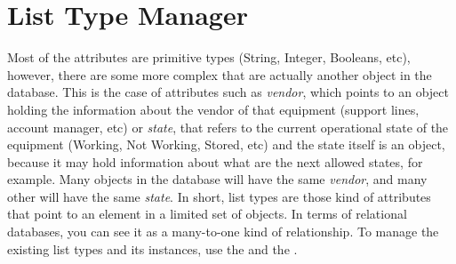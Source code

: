 \documentclass[a4paper]{article}
\begin{document}
	\section{List Type Manager} \label{sec:list_type_manager}
	Most of the attributes are primitive types (String, Integer, Booleans, etc), however, there are some more complex that are actually another object in the database. This is the case of attributes such as \textit{vendor}, which points to an object holding the information about the vendor of that equipment (support lines, account manager, etc) or \textit{state}, that refers to the current operational state of the equipment (Working, Not Working, Stored, etc) and the state itself is an object, because it may hold information about what are the next allowed states, for example. Many objects in the database will have the same \textit{vendor}, and many other will have the same \textit{state}. In short, list types are those kind of attributes that point to an element in a limited set of objects. In terms of relational databases, you can see it as a many-to-one kind of relationship. To manage the existing list types and its instances, use the \textbf{} and the \textbf{}. \newline
	
\end{document}
